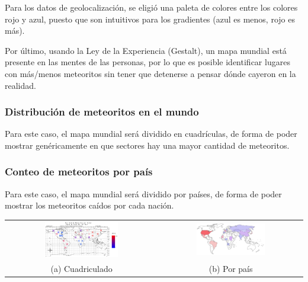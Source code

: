 \documentclass[letterpaper,10pt]{article}
\begin{document}
	Para los datos de geolocalización, se eligió una paleta de colores entre los colores rojo y azul, puesto que son intuitivos para los gradientes (azul es menos, rojo es más).

	Por último, usando la Ley de la Experiencia (Gestalt), un mapa mundial está presente en las mentes de las personas, por lo que es posible identificar lugares con más/menos meteoritos
	sin tener que detenerse a pensar dónde cayeron en la realidad.

	\subsubsection{Distribución de meteoritos en el mundo}

	Para este caso, el mapa mundial será dividido en cuadrículas, de forma de poder mostrar genéricamente en que sectores hay una mayor cantidad de meteoritos.

	\subsubsection{Conteo de meteoritos por país}

	Para este caso, el mapa mundial será dividido por países, de forma de poder mostrar los meteoritos caídos por cada nación.

	\begin{tabular}{cc}
		\includegraphics[width=0.5\textwidth]{mapamundiQuad.png} & \includegraphics[width=0.5\textwidth]{mapamundiPol.png}\\
		(a) Cuadriculado & (b) Por país\\
	\end{tabular}

	\newpage
\end{document}
